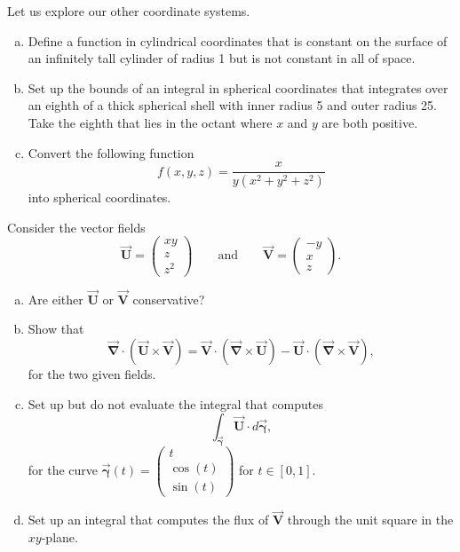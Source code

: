 \documentclass[12pt]{amsbook}
\newcommand{\vecfieldV}{\boldsymbol{\vec{V}}}
\newcommand{\vecfieldU}{\boldsymbol{\vec{U}}}
\newcommand{\curvegamma}{\boldsymbol{\vec{\gamma}}}
\newcommand{\grad}{\boldsymbol{\vec{\nabla}}}
\begin{document}
\newpage
\begin{problem} Let us explore our other coordinate systems.
    \begin{enumerate}[(a)]
        \item Define a function in cylindrical coordinates that is constant on the surface of an infinitely tall cylinder of radius 1 but is not constant in all of space.
        \vspace*{0.25cm}
        \item Set up the bounds of an integral in spherical coordinates that integrates over an eighth of a thick spherical shell with inner radius 5 and outer radius 25. Take the eighth that lies in the octant where $x$ and $y$ are both positive.
        \vspace*{0.25cm}
        \item Convert the following function 
        \[
        f(x,y,z) = \frac{x}{y(x^2+y^2+z^2)}
        \]
        into spherical coordinates.
    \end{enumerate}
\end{problem}

\newpage
\begin{problem} 
Consider the vector fields
\[
\vecfieldU = \begin{pmatrix} xy \\ z \\ z^2 \end{pmatrix} \qquad \textrm{and} \qquad \vecfieldV = \begin{pmatrix} -y \\ x \\ z \end{pmatrix}.
\]
        \vspace*{0.25cm}
\begin{enumerate}[(a)]
    \item Are either $\vecfieldU$ or $\vecfieldV$ conservative? 
        \vspace*{0.25cm}
    \item Show that
    \[
        \grad \cdot (\vecfieldU \times \vecfieldV) = \vecfieldV \cdot (\grad \times \vecfieldU) - \vecfieldU \cdot (\grad \times \vecfieldV),
    \]
    for the two given fields.
        \vspace*{0.25cm}
    \item Set up but do not evaluate the integral that computes
    \[
        \int_{\curvegamma} \vecfieldU \cdot d\curvegamma,
    \]
    for the curve $\curvegamma(t) = \begin{pmatrix} t \\ \cos(t) \\ \sin(t) \end{pmatrix}$ for $t\in [0,1]$.
        \vspace*{0.25cm}
    \item Set up an integral that computes the flux of $\vecfieldV$ through the unit square in the $xy$-plane.
\end{enumerate}
\end{problem}
\end{document}
